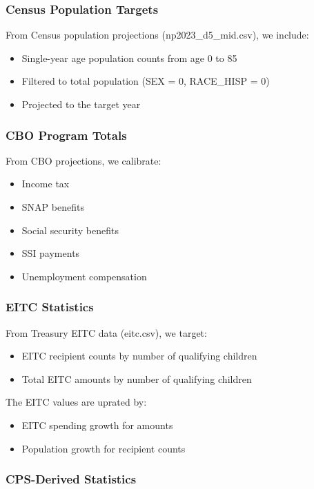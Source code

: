 \subsubsection{Census Population Targets}

From Census population projections (np2023\_d5\_mid.csv), we include:
\begin{itemize}
    \item Single-year age population counts from age 0 to 85
    \item Filtered to total population (SEX = 0, RACE\_HISP = 0)
    \item Projected to the target year
\end{itemize}

\subsubsection{CBO Program Totals}

From CBO projections, we calibrate:
\begin{itemize}
    \item Income tax
    \item SNAP benefits
    \item Social security benefits
    \item SSI payments
    \item Unemployment compensation
\end{itemize}

\subsubsection{EITC Statistics}

From Treasury EITC data (eitc.csv), we target:
\begin{itemize}
    \item EITC recipient counts by number of qualifying children
    \item Total EITC amounts by number of qualifying children
\end{itemize}

The EITC values are uprated by:
\begin{itemize}
    \item EITC spending growth for amounts
    \item Population growth for recipient counts
\end{itemize}

\subsubsection{CPS-Derived Statistics}

